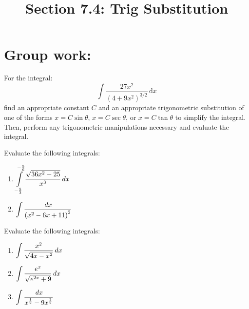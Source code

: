 \documentclass[noinstructornotes]{ximera}
\title{Section 7.4: Trig Substitution}
\begin{document}
\begin{abstract}		\end{abstract}
\maketitle



\begin{comment}
\section{Warm up:}

	\begin{freeResponse}
	
	\end{freeResponse}
	
\begin{instructorNotes}

\end{instructorNotes}
\end{comment}


\section{Group work:}

\begin{problem}
For the integral:
$$\displaystyle \int \frac{27 x^2}{(4+9x^2)^{3/2}} \, \mathrm{d}x$$
find an appropriate constant $C$ and an appropriate trigonometric substitution of one of the forms $x=C \sin \theta$, $x=C \sec \theta$, or $x=C \tan \theta$ to simplify the integral.  Then, perform any  trigonometric manipulations necessary and evaluate the integral.


\end{problem}

\begin{problem}
Evaluate the following integrals:
	\begin{enumerate}
	\item $\displaystyle \int \limits_{ -\frac{5}{3}}^{-\frac{5}{6}} \frac{\sqrt{36x^2-25}}{x^3} \,d x$
	\item $\displaystyle \int \frac{\,d x}{\left( x^2 - 6x + 11 \right)^2}$
	
	\end{enumerate}

\end{problem}


\begin{problem}
Evaluate the following integrals:
	\begin{enumerate}

		
	\item $\displaystyle \int \frac{x^2}{\sqrt{4x-x^2}} \,d x$
	\item $\displaystyle \int \frac{e^x}{\sqrt{e^{2x}+9}} \,d x$
	\item $\displaystyle \int \frac{\,d x}{x^{\frac{1}{2}} - 9x^{\frac{3}{2}}}$
	
	

	\end{enumerate}

\end{problem}
\end{document}
